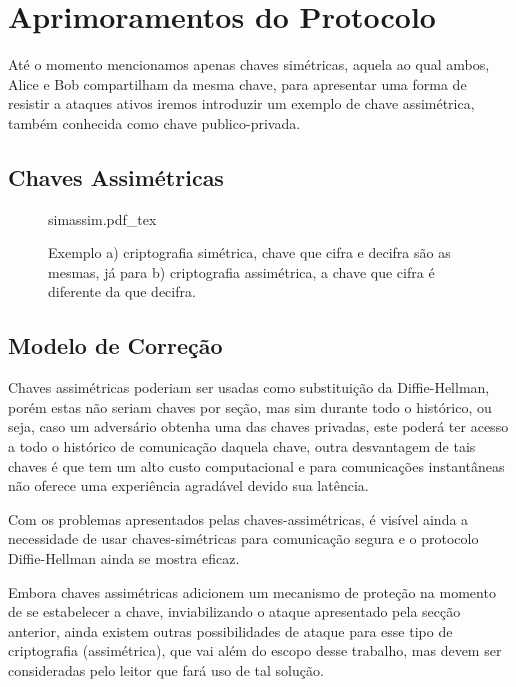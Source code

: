\documentclass{article}
\begin{document}
\section{Aprimoramentos do Protocolo}
\label{sec:aprimoramentos_protocolo}
Até o momento mencionamos apenas chaves simétricas, aquela ao qual ambos, Alice e Bob compartilham da mesma chave, para apresentar uma forma de resistir a ataques ativos iremos introduzir um exemplo de chave assimétrica, também conhecida como chave publico-privada.

\subsection{Chaves Assimétricas}
\label{sub:chaves_assimetricas}

\begin{figure}[htpb]
    \centering
    \def\svgwidth{\columnwidth}
    {simassim.pdf_tex}
    \caption{Exemplo a) criptografia simétrica, chave que cifra e decifra
        são as mesmas, já para b) criptografia assimétrica, a chave que
        cifra é diferente da que decifra.}%
    \label{fig:sim_assim}
\end{figure}

\subsection{Modelo de Correção}
\label{sub:modelo_correcao}
Chaves assimétricas poderiam ser usadas como substituição da Diffie-Hellman,
porém estas não seriam chaves por seção, mas sim durante todo o histórico, ou
seja, caso um adversário obtenha uma das chaves privadas, este poderá ter
acesso a todo o histórico de comunicação daquela chave, outra desvantagem de
tais chaves é que tem um alto custo computacional e para comunicações
instantâneas não oferece uma experiência agradável devido sua latência.

Com os problemas apresentados pelas chaves-assimétricas, é visível ainda a
necessidade de usar chaves-simétricas para comunicação segura e o protocolo
Diffie-Hellman ainda se mostra eficaz.


Embora chaves assimétricas adicionem um mecanismo de proteção na momento de
se estabelecer a chave, inviabilizando o ataque apresentado pela secção anterior,
ainda existem outras possibilidades de ataque para esse tipo de criptografia
(assimétrica), que vai além do escopo desse trabalho, mas devem ser consideradas
pelo leitor que fará uso de tal solução.
\end{document}
